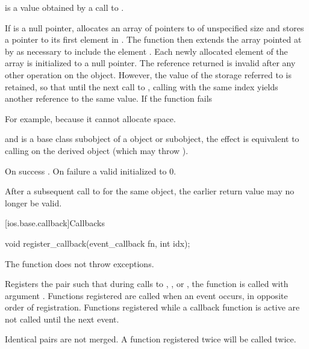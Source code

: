 \begin{itemdescr}
\pnum
\expects
{} is a value obtained by a call to .

\pnum
\effects
If  is a null pointer, allocates an array of
pointers to  of unspecified size and stores a pointer to
its
first element in .
The function then extends the array
pointed at by  as necessary to include the element
.
Each newly allocated element of the array is initialized to a null
pointer.
The reference returned is invalid after any other operation on the
object.
However, the value of the storage referred to is retained, so
that until the next call to
,
calling
with the same index yields another reference to the same value.
If the function fails
\begin{footnote}
For example, because it cannot allocate space.
\end{footnote}
and
is a base class subobject of a
object or subobject, the effect is equivalent to calling
on the derived object (which may throw
).

\pnum
\returns
On success
.
On failure a valid
initialized to 0.

\pnum
\remarks
After a subsequent call to
for the same object, the earlier return value may no longer be valid.
\end{itemdescr}

[ios.base.callback]{Callbacks}

%
\begin{itemdecl}
void register_callback(event_callback fn, int idx);
\end{itemdecl}

\begin{itemdescr}
\pnum
\expects
The function
does not throw exceptions.

\pnum
\effects
Registers the pair
such that during calls to
,
,
or
,
the function
is called with argument
.
Functions registered are called when an event occurs, in opposite order of
registration.
Functions registered while a callback function is active are not called until the next event.

\pnum
\remarks
Identical pairs are not merged.
A function registered twice will be called twice.
\end{itemdescr}

